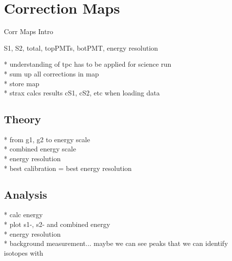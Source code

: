 
\section{Correction Maps}
\label{sec:CorrMap}


Corr Maps Intro

S1, S2, total, topPMTs, botPMT, energy resolution


* understanding of tpc has to be applied for science run \\
* sum up all corrections in map \\
* store map \\
* strax calcs results cS1, cS2, etc when loading data

\subsection{Theory}

* from g1, g2 to energy scale \\
* combined energy scale \\
* energy resolution \\
* best calibration = best energy resolution


\subsection{Analysis}

* calc energy \\
* plot s1-, s2- and combined energy \\
* energy resolution \\
* background measurement... maybe we can see peaks that we can identify isotopes with


